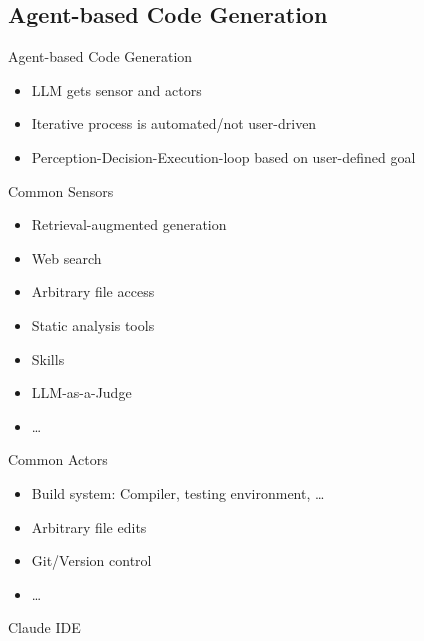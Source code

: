 \subsection{Agent-based Code Generation}
\begin{frame}{\insertsubsection{}  }
	\begin{fancycolumns}[animation=none]
		\begin{definition}{Agent-based Code Generation}
			\begin{itemize}
				\item LLM gets sensor and actors 
				\item Iterative process is automated/not user-driven
				\item Perception-Decision-Execution-loop based on user-defined goal
			\end{itemize}
		\end{definition} \pause
		\begin{note}{Common Sensors}
			\small
			\begin{itemize}
				\item Retrieval-augmented generation
				\item Web search
				\item Arbitrary file access
				\item Static analysis tools
				\item Skills
				\item LLM-as-a-Judge
				\item \dots
			\end{itemize}
		\end{note} \pause
		\nextcolumn
		\begin{note}{Common Actors}
		\small
		\begin{itemize}
			\item Build system: Compiler, testing environment, \dots
			\item Arbitrary file edits
			\item Git/Version control
			\item \dots
		\end{itemize}
		\end{note} \pause
		\begin{example}{Claude IDE}
			\centering{}
		\end{example}
	\end{fancycolumns}
\end{frame}

